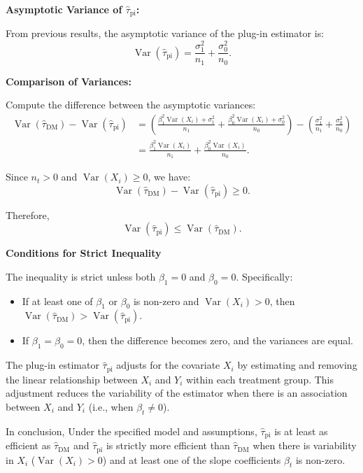 \documentclass{article}
\begin{document}
\textbf{Asymptotic Variance of $\hat{\tau}_{\text{pi}}$:}

From previous results, the asymptotic variance of the plug-in estimator is:
\[
\operatorname{Var}(\hat{\tau}_{\text{pi}}) = \frac{\sigma_1^2}{n_1} + \frac{\sigma_0^2}{n_0}.
\]

\textbf{Comparison of Variances:}

Compute the difference between the asymptotic variances:
\begin{align*}
\operatorname{Var}(\hat{\tau}_{\text{DM}}) - \operatorname{Var}(\hat{\tau}_{\text{pi}}) &= \left( \frac{\beta_1^2 \operatorname{Var}(X_i) + \sigma_1^2}{n_1} + \frac{\beta_0^2 \operatorname{Var}(X_i) + \sigma_0^2}{n_0} \right) - \left( \frac{\sigma_1^2}{n_1} + \frac{\sigma_0^2}{n_0} \right) \\
&= \frac{\beta_1^2 \operatorname{Var}(X_i)}{n_1} + \frac{\beta_0^2 \operatorname{Var}(X_i)}{n_0}.
\end{align*}

Since $n_t > 0$ and $\operatorname{Var}(X_i) \geq 0$, we have:
\[
\operatorname{Var}(\hat{\tau}_{\text{DM}}) - \operatorname{Var}(\hat{\tau}_{\text{pi}}) \geq 0.
\]

Therefore,
\[
\operatorname{Var}(\hat{\tau}_{\text{pi}}) \leq \operatorname{Var}(\hat{\tau}_{\text{DM}}).
\]

\textbf{Conditions for Strict Inequality}

The inequality is strict unless both $\beta_1 = 0$ and $\beta_0 = 0$. Specifically:
\begin{itemize}
    \item If at least one of $\beta_1$ or $\beta_0$ is non-zero and $\operatorname{Var}(X_i) > 0$, then $\operatorname{Var}(\hat{\tau}_{\text{DM}}) > \operatorname{Var}(\hat{\tau}_{\text{pi}})$.
    \item If $\beta_1 = \beta_0 = 0$, then the difference becomes zero, and the variances are equal.
\end{itemize}

The plug-in estimator $\hat{\tau}_{\text{pi}}$ adjusts for the covariate $X_i$ by estimating and removing the linear relationship between $X_i$ and $Y_i$ within each treatment group. This adjustment reduces the variability of the estimator when there is an association between $X_i$ and $Y_i$ (i.e., when $\beta_t \neq 0$).

In conclusion, Under the specified model and assumptions, $\hat{\tau}_{\text{pi}}$ is at least as efficient as $\hat{\tau}_{\text{DM}}$ and $\hat{\tau}_{\text{pi}}$ is strictly more efficient than $\hat{\tau}_{\text{DM}}$ when there is variability in $X_i$ ($\operatorname{Var}(X_i) > 0$) and at least one of the slope coefficients $\beta_t$ is non-zero.
\end{document}
